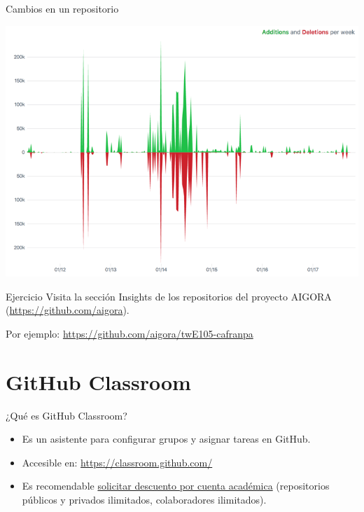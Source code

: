 \documentclass[aspectratio=169, xcolor={usenames,svgnames,dvipsnames}]{beamer}
\begin{document}
\begin{frame}[label={sec:org7af2706}]{Cambios en un repositorio}
\begin{center}
\includegraphics[width=.9\linewidth]{figs/repo_code_frequency_graph_dotcom.png}
\end{center}
\end{frame}

\begin{frame}[label={sec:org99db449}]{}
\begin{block}{Ejercicio}
Visita la sección Insights de los repositorios del proyecto AIGORA (\url{https://github.com/aigora}). 

Por ejemplo: \url{https://github.com/aigora/twE105-cafranpa}
\end{block}
\end{frame}

\section{GitHub Classroom}
\label{sec:orgaff3acc}

\begin{frame}[label={sec:orgdcdd026}]{¿Qué es GitHub Classroom?}
\begin{itemize}
\item Es un asistente para configurar grupos y asignar tareas en GitHub.

\item Accesible en: \url{https://classroom.github.com/}

\item Es recomendable \href{https://help.github.com/en/articles/applying-for-an-educator-or-researcher-discount}{solicitar descuento por cuenta académica} (repositorios públicos y privados ilimitados, colaboradores ilimitados).
\end{itemize}
\end{frame}
\end{document}
